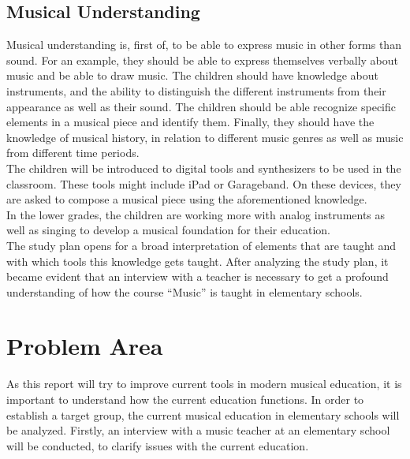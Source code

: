 \subsection*{Musical Understanding}
Musical understanding is, first of, to be able to express music in other forms than sound. For an example, they should be able to express themselves verbally about music and be able to draw music. The children should have knowledge about instruments, and the ability to distinguish the different instruments from their appearance as well as their sound. The children should be able recognize specific elements in a musical piece and identify them. Finally, they should have the knowledge of musical history, in relation to different music genres as well as music from different time periods.
\\

The children will be introduced to digital tools and synthesizers to be used in the classroom. These tools might include iPad or Garageband. On these devices, they are asked to compose a musical piece using the aforementioned knowledge.\\
In the lower grades, the children are working more with analog instruments as well as singing to develop a musical foundation for their education.
\\

The study plan opens for a broad interpretation of elements that are taught and with which tools this knowledge gets taught. After analyzing the study plan, it became evident that an interview with a teacher is necessary to get a profound understanding of how the course “Music” is taught in elementary schools.\\


\section{Problem Area}\label{sec:problemArea}
As this report will try to improve current tools in modern musical education, it is important to understand how the current education functions. In order to establish a target group, the current musical education in elementary schools will be analyzed. Firstly, an interview with a music teacher at an elementary school will be conducted, to clarify  issues with the current education. \\	




